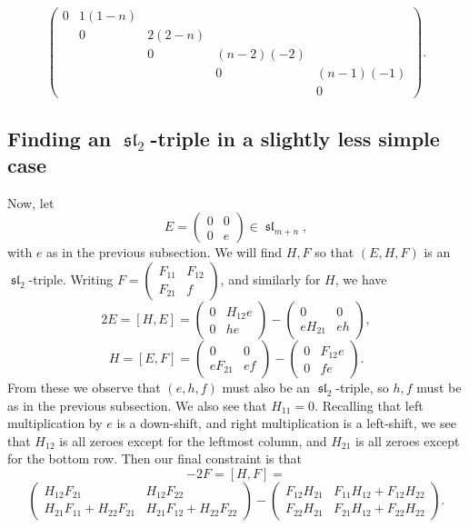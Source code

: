 \documentclass[12pt,psamsfonts]{article}
\DeclareMathOperator{\spl}{\mathfrak{sl}}
\begin{document}
\[\begin{pmatrix}
    0 & 1 (1 - n) \\
      & 0 & 2 (2 - n) \\
    & & 0 & (n - 2) (-2) \\
    & & & 0 & (n - 1) (-1)\\
    & &  & & 0
\end{pmatrix}.\]

\subsection{Finding an \(\spl_2\)-triple in a slightly less simple case}
Now, let 
\[E = \begin{pmatrix}
    0 & 0 \\
    0 & e
\end{pmatrix} \in \spl_{m + n},\]
with \(e\) as in the previous subsection.
We will find \(H, F\) so that \((E, H, F)\) is an \(\spl_2\)-triple.
Writing \(F = \begin{pmatrix}
    F_{11} & F_{12} \\
    F_{21} & f
\end{pmatrix}\), and similarly for \(H\), we have
\[2E = [H, E] = \begin{pmatrix}
    0 & H_{12}e \\
    0 & he
\end{pmatrix} - \begin{pmatrix}
    0 & 0 \\
    e H_{21} & eh
\end{pmatrix},\]
\[H = [E, F] = \begin{pmatrix}
    0 & 0 \\
    e F_{21} & ef
\end{pmatrix} - \begin{pmatrix}
    0 & F_{12}e \\
    0 & fe
\end{pmatrix}.\]
From these we observe that \((e, h, f)\) must also be an \(\spl_2\)-triple, so \(h, f\) must be as in the previous subsection.
We also see that \(H_{11} = 0\).
Recalling that left multiplication by \(e\) is a down-shift, and right multiplication is a left-shift, we see that \(H_{12}\) is all zeroes except for the leftmost column, and \(H_{21}\) is all zeroes except for the bottom row.
Then our final constraint is that 
\[-2F = [H, F] = \]
\[\begin{pmatrix}
    H_{12} F_{21} & H_{12} F_{22} \\
    H_{21} F_{11} + H_{22} F_{21} & H_{21} F_{12} + H_{22} F_{22}
\end{pmatrix} - \begin{pmatrix}
    F_{12} H_{21} & F_{11} H_{12} + F_{12} H_{22} \\
    F_{22} H_{21} & F_{21} H_{12} + F_{22} H_{22}
\end{pmatrix}.\]
\end{document}

